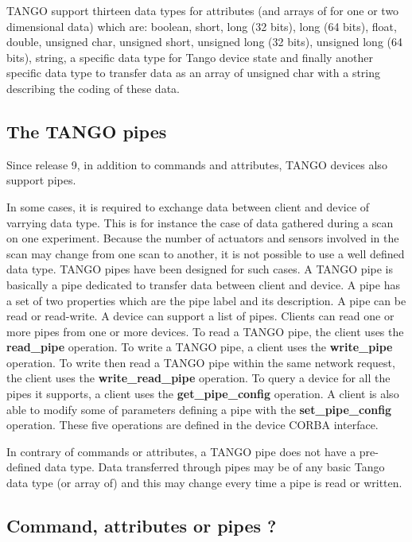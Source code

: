 TANGO support thirteen data types for attributes (and arrays of for
one or two dimensional data) which are: boolean, short, long (32 bits),
long (64 bits), float, double, unsigned char, unsigned short, unsigned
long (32 bits), unsigned long (64 bits), string, a specific data type
for Tango device state and finally another specific data type to transfer
data as an array of unsigned char with a string describing the coding
of these data.


\subsection{The TANGO pipes}

Since release 9, in addition to commands and attributes, TANGO devices
also support pipes.

In some cases, it is required to exchange data between client and
device of varrying data type. This is for instance the case of data
gathered during a scan on one experiment. Because the number of actuators
and sensors involved in the scan may change from one scan to another,
it is not possible to use a well defined data type. TANGO pipes have
been designed for such cases. A TANGO pipe is basically a pipe dedicated
to transfer data between client and device. A pipe has a set of two
properties which are the pipe label and its description. A pipe can
be read or read-write. A device can support a list of pipes. Clients
can read one or more pipes from one or more devices. To read a TANGO
pipe, the client uses the \textbf{read\_pipe} operation.
To write a TANGO pipe, a client uses the \textbf{write\_pipe}
operation. To write then read a TANGO pipe within the same network
request, the client uses the \textbf{write\_read\_pipe}
operation. To query a device for all the pipes it supports, a client
uses the \textbf{get\_pipe\_config} operation.
A client is also able to modify some of parameters defining a pipe
with the \textbf{set\_pipe\_config} operation.
These five operations are defined in the device CORBA interface.

In contrary of commands or attributes, a TANGO pipe does not have
a pre-defined data type. Data transferred through pipes may be of
any basic Tango data type (or array of) and this may change every
time a pipe is read or written. 


\subsection{Command, attributes or pipes ?}

